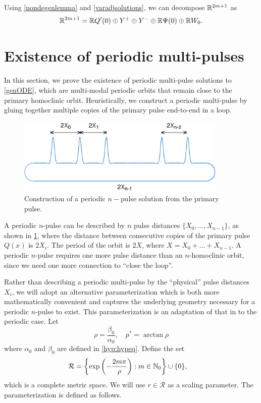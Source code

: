 \documentclass[10pt,reqno]{amsart}
\theoremstyle{plain}
\theoremstyle{definition}
\theoremstyle{remark}
\numberwithin{theorem}{section}
\numberwithin{equation}{section}
\begin{document}
\noi Using \cref{nondegenlemma} and \cref{varadjsolutions}, we can decompose $\mathbb{R}^{2m+1}$ as 
\begin{equation}\label{DSdecomp}
\mathbb{R}^{2m+1} = \mathbb{R} Q'(0) \oplus Y^+ \oplus Y^- \oplus \mathbb{R} \Psi(0) \oplus \mathbb{R} W_0.
\end{equation}

\section{Existence of periodic multi-pulses}\label{sec:perexist}

In this section, we prove the existence of periodic multi-pulse solutions to \cref{genODE}, which are multi-modal periodic orbits that remain close to the primary homoclinic orbit. Heuristically, we construct a periodic multi-pulse by gluing together multiple copies of the primary pulse end-to-end in a loop.
\begin{figure}[H]
\begin{center}
\includegraphics[width=10cm]{images/multipulseperiodic}
\end{center}
\caption[Construction of a periodic $n$-pulse solution]{Construction of a periodic $n-$pulse solution from the primary pulse.}
\label{fig:permultipulse}
\end{figure}
\noi A periodic $n$-pulse can be described by $n$ pulse distances $\{X_0, \dots, X_{n-1} \}$, as shown in \cref{fig:permultipulse}, where the distance between consecutive copies of the primary pulse $Q(x)$ is $2 X_i$. The period of the orbit is $2X$, where $X = X_0 + \dots + X_{n-1}$. A periodic $n$-pulse requires one more pulse distance than an $n$-homoclinic orbit, since we need one more connection to ``close the loop''.  

Rather than describing a periodic multi-pulse by the ``physical'' pulse distances $X_i$, we will adopt an alternative parameterization which is both more mathematically convenient and captures the underlying geometry necessary for a periodic $n$-pulse to exist. This parameterization is an adaptation of that in \cite{SandstedeStrut,Sandstede1998} to the periodic case. Let
\begin{equation}\label{defrho}
\rho = \frac{\beta_0}{\alpha_0}, \quad p^* = \arctan \rho
\end{equation}
where $\alpha_0$ and $\beta_0$ are defined in \cref{hyp:hypeq}. Define the set
\begin{align}
\mathcal{R} &= \left\{ \mathop\mathrm{exp}\nolimits\left(-\frac{2 m \pi}{\rho}\right) : m \in \mathbb{N}_0 \right\} \cup \{ 0 \},
\end{align}
which is a complete metric space. We will use $r \in \mathcal{R}$ as a scaling parameter. The parameterization is defined as follows.
\end{document}
